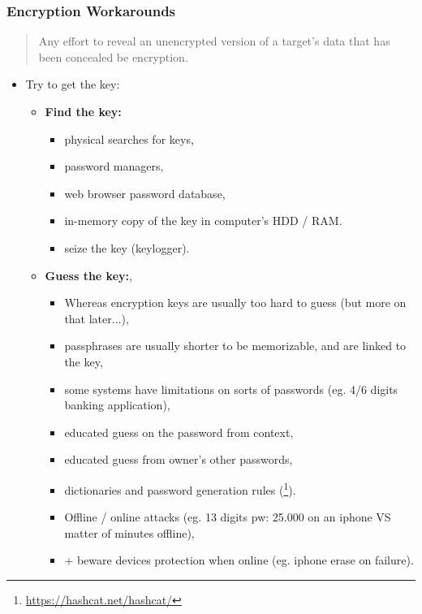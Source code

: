 \documentclass{beamer}
\begin{document}
\begin{frame}[allowframebreaks]
        \frametitle{Encryption Workarounds~\cite{kerr2017}}
        \begin{quote}
          Any effort to reveal an unencrypted version of a target's data that
          has been concealed be encryption.
        \end{quote}
        \begin{itemize}
          \item Try to get the key:
          \begin{itemize}
        \item {\bf Find the key:} 
          \begin{itemize}
          \item physical searches for keys,
          \item password managers,
          \item web browser password database,
          \item in-memory copy of the key in computer's HDD / RAM.
          \item seize the key (keylogger).
          \end{itemize}
        \item {\bf Guess the key:},
          \begin{itemize}
            \item Whereas encryption keys are usually too hard to guess (but more on that
              later...),
            \item passphrases are usually shorter to be memorizable, and are
              linked to the key,
            \item some systems have limitations on sorts of passwords (eg. 4/6
              digits banking application),
            \item educated guess on the password from context,
            \item educated guess from owner's other passwords,
            \item dictionaries and password generation rules (\footnote{\url{https://hashcat.net/hashcat/}}).
            \item Offline / online attacks (eg. 13 digits pw: 25.000 on an
              iphone VS matter of minutes offline),
            \item + beware devices protection when online (eg. iphone erase on failure).
          \end{itemize}
         

\end{itemize}
\end{itemize}
\end{frame}
\end{document}
